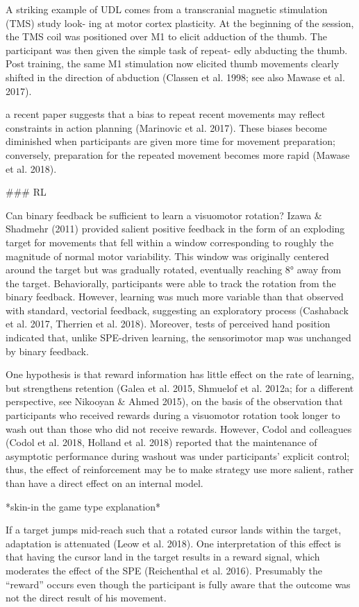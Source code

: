 \documentclass[../main.tex]{subfiles}
\begin{document}
{{A striking example of UDL comes from a transcranial magnetic stimulation (TMS) study look- ing at motor cortex plasticity. At the beginning of the session, the TMS coil was positioned over M1 to elicit adduction of the thumb. The participant was then given the simple task of repeat- edly abducting the thumb. Post training, the same M1 stimulation now elicited thumb movements clearly shifted in the direction of abduction (Classen et al. 1998; see also Mawase et al. 2017).

a recent paper suggests that a bias to repeat recent movements may reflect constraints in action planning (Marinovic et al. 2017). These biases become diminished when participants are given more time for movement preparation; conversely, preparation for the repeated movement becomes more rapid (Mawase et al. 2018).

### RL 

Can binary feedback be sufficient to learn a visuomotor rotation? Izawa & Shadmehr (2011) provided salient positive feedback in the form of an exploding target for movements that fell within a window corresponding to roughly the magnitude of normal motor variability. This window was originally centered around the target but was gradually rotated, eventually reaching 8° away from the target. Behaviorally, participants were able to track the rotation from the binary feedback. However, learning was much more variable than that observed with standard, vectorial feedback, suggesting an exploratory process (Cashaback et al. 2017, Therrien et al. 2018). Moreover, tests of perceived hand position indicated that, unlike SPE-driven learning, the sensorimotor map was unchanged by binary feedback.

One hypothesis is that reward information has little effect on the rate of learning, but strengthens retention (Galea et al. 2015, Shmuelof et al. 2012a; for a different perspective, see Nikooyan & Ahmed 2015), on the basis of the observation that participants who received rewards during a visuomotor rotation took longer to wash out than those who did not receive rewards. However, Codol and colleagues (Codol et al. 2018, Holland et al. 2018) reported that the maintenance of asymptotic performance during washout was under participants’ explicit control; thus, the effect of reinforcement may be to make strategy use more salient, rather than have a direct effect on an internal model.

*skin-in the game type explanation*

If a target jumps mid-reach such that a rotated cursor lands within the target, adaptation is attenuated (Leow et al. 2018). One interpretation of this effect is that having the cursor land in the target results in a reward signal, which moderates the effect of the SPE (Reichenthal et al. 2016). Presumably the “reward” occurs even though the participant is fully aware that the outcome was not the direct result of his movement.

}}
\end{document}
